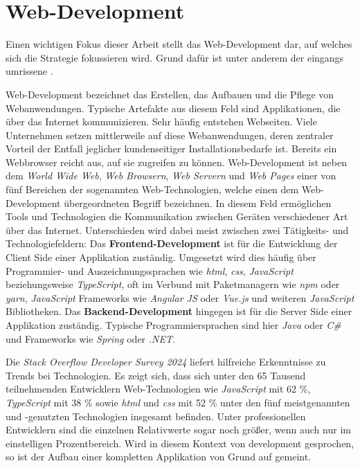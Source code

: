\section{Web-Development}
\label{sec:02-01_web-development}

Einen wichtigen Fokus dieser Arbeit stellt das Web-Development dar, auf welches sich die  Strategie fokussieren wird. Grund dafür ist unter anderem der eingangs umrissene .

Web-Development bezeichnet das Erstellen, das Aufbauen und die Pflege von Webanwendungen. Typische Artefakte aus diesem Feld sind Applikationen, die über das Internet kommunizieren. Sehr häufig entstehen Webseiten. \cite{209:Web-Development} Viele Unternehmen setzen mittlerweile auf diese Webanwendungen, deren zentraler Vorteil der Entfall jeglicher kundenseitiger Installationsbedarfe ist. Bereits ein Webbrowser reicht aus, auf sie zugreifen zu können. \cite{002:Optimizing-Cloud-Applications-with-DevOps} Web-Development ist neben dem \textit{World Wide Web}, \textit{Web Browsern}, \textit{Web Servern} und \textit{Web Pages} einer von fünf Bereichen der sogenannten Web-Technologien, welche einen dem Web-Development übergeordneten Begriff bezeichnen. In diesem Feld ermöglichen Tools und Technologien die Kommunikation zwischen Geräten verschiedener Art über das Internet. Unterschieden wird dabei meist zwischen zwei Tätigkeits- und Technologiefeldern: Das \textbf{Frontend-Development} ist für die Entwicklung der Client Side einer Applikation zuständig. Umgesetzt wird dies häufig über Programmier- und Auszeichnungssprachen wie \textit{\Gls{html}}, \textit{\Gls{css}}, \textit{JavaScript} beziehungsweise \textit{TypeScript}, oft im Verbund mit Paketmanagern wie \textit{npm} oder \textit{yarn}, \textit{JavaScript} Frameworks wie \textit{Angular JS} oder \textit{Vue.js} und weiteren \textit{JavaScript} Bibliotheken. Das \textbf{Backend-Development} hingegen ist für die Server Side einer Applikation zuständig. Typische Programmiersprachen sind hier \textit{Java} oder \textit{C\#} und Frameworks wie \textit{Spring} oder \textit{.NET}. \cite{208:Web-Technology}

Die \textit{Stack Overflow Developer Survey 2024} liefert hilfreiche Erkenntnisse zu Trends bei Technologien. Es zeigt sich, dass sich unter den 65 Tausend teilnehmenden Entwicklern Web-Technologien wie \textit{JavaScript} mit 62 \%, \textit{TypeScript} mit 38 \% sowie \textit{\Gls{html}} und \textit{\Gls{css}} mit 52 \% unter den fünf meistgenannten und -genutzten Technologien insgesamt befinden. Unter professionellen Entwicklern sind die einzelnen Relativwerte sogar noch größer, wenn auch nur im einstelligen Prozentbereich. \cite{206:Developer-Survey-2024} Wird in diesem Kontext von \Gls{development} gesprochen, so ist der Aufbau einer kompletten Applikation von Grund auf gemeint.

